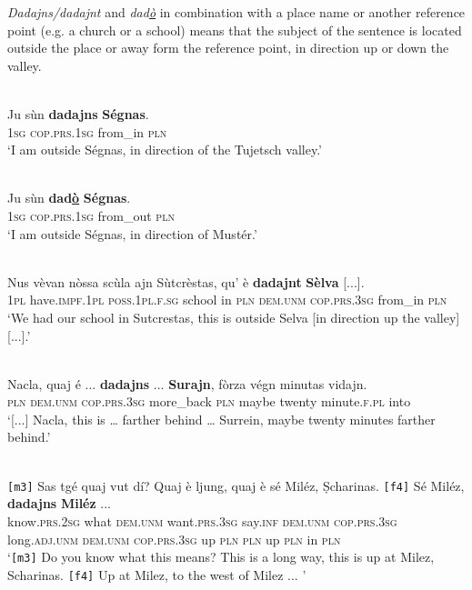 \textit{Dadajns/dadajnt} and \textit{dad\underline{ò}} in combination with a place name or another reference point (e.g. a church or a school) means that the subject of the sentence is located outside the place or away form the reference point, in direction up or down the valley.

\ea
\label{}
\\
\gll Ju sùn \textbf{dadajns} \textbf{Ségnas}.\\
\textsc{1sg} \textsc{cop.prs.1sg} from\_in \textsc{pln}\\
\glt `I am outside Ségnas, in direction of the Tujetsch valley.'
\z

\ea
\label{}
\\
\gll Ju sùn \textbf{dad\underline{ò}} \textbf{Ségnas}.\\
\textsc{1sg} \textsc{cop.prs.1sg} from\_out \textsc{pln}\\
\glt `I am outside Ségnas, in direction of Mustér.'
\z

\ea
\label{}
\\
\gll Nus vèvan nòssa scùla ajn Sùtcrèstas, qu’ è \textbf{dadajnt} \textbf{Sèlva} [...]. \\
\textsc{1pl} have.\textsc{impf.1pl} \textsc{poss.1pl.f.sg} school in \textsc{pln} \textsc{dem.unm} \textsc{cop.prs.3sg} from\_in \textsc{pln}\\
\glt `We had our school in Sutcrestas, this is outside Selva [in direction up the valley] [...].'
\z

\ea
\label{}
\\
\gll [...] Nacla, quaj é ... \textbf{dadajns} ... \textbf{Surajn}, fòrza végn minutas vidajn.\\
{} \textsc{pln} \textsc{dem.unm} \textsc{cop.prs.3sg} {} more\_back {} \textsc{pln} maybe twenty minute.\textsc{f.pl} into\\
\glt `[...] Nacla, this is … farther behind … Surrein, maybe twenty minutes farther behind.'
\z

\ea
\label{}
\\
	\gll \texttt{[m3]} Sas tgé quaj vut dí? Quaj è ljung, quaj è sé Miléz, Ṣcharinas. \texttt{[f4]} Sé Miléz, \textbf{dadajns} \textbf{Miléz} ... \\ 
{} know.\textsc{prs.2sg} what \textsc{dem.unm} want.\textsc{prs.3sg} say.\textsc{inf} \textsc{dem.unm} \textsc{cop.prs.3sg} long.\textsc{adj.unm} \textsc{dem.unm} \textsc{cop.prs.3sg} up \textsc{pln} \textsc{pln} {} up \textsc{pln} in \textsc{pln}\\
\glt  `\texttt{[m3]} Do you know what this means? This is a long way, this is up at Milez, Scharinas. \texttt{[f4]} Up at Milez, to the west of Milez ... '
\z

